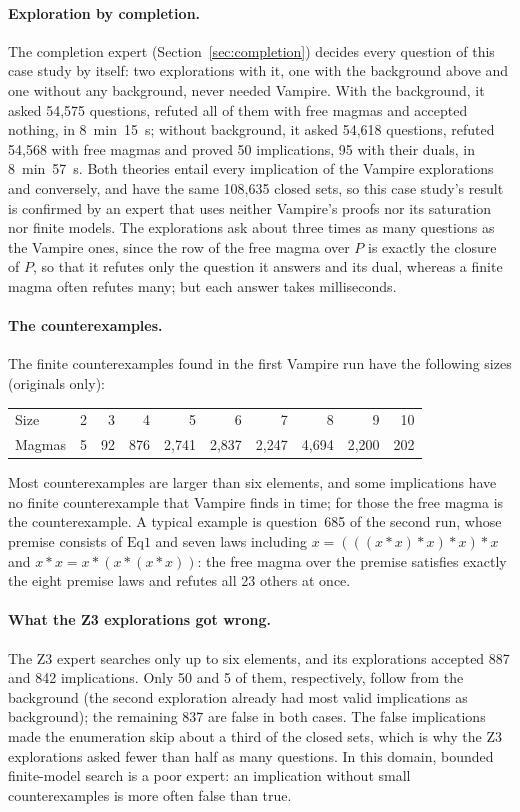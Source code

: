 \documentclass[11pt,a4paper]{article}
\theoremstyle{definition}
\theoremstyle{remark}
\newcommand{\Eq}[1]{\mathrm{Eq}#1}
\begin{document}
\paragraph{Exploration by completion.}
The completion expert (Section~\ref{sec:completion}) decides every question of this case study by itself: two explorations with it, one with the background above and one without any background, never needed Vampire. With the background, it asked 54,575 questions, refuted all of them with free magmas and accepted nothing, in 8~min~15~s; without background, it asked 54,618 questions, refuted 54,568 with free magmas and proved 50 implications, 95 with their duals, in 8~min~57~s. Both theories entail every implication of the Vampire explorations and conversely, and have the same 108,635 closed sets, so this case study's result is confirmed by an expert that uses neither Vampire's proofs nor its saturation nor finite models. The explorations ask about three times as many questions as the Vampire ones, since the row of the free magma over $P$ is exactly the closure of $P$, so that it refutes only the question it answers and its dual, whereas a finite magma often refutes many; but each answer takes milliseconds.

\paragraph{The counterexamples.}
The finite counterexamples found in the first Vampire run have the following sizes (originals only):
\begin{center}
\small
\begin{tabular}{@{}lrrrrrrrrr@{}}
\toprule
Size & 2 & 3 & 4 & 5 & 6 & 7 & 8 & 9 & 10 \\
Magmas & 5 & 92 & 876 & 2,741 & 2,837 & 2,247 & 4,694 & 2,200 & 202 \\
\bottomrule
\end{tabular}
\end{center}
Most counterexamples are larger than six elements, and some implications have no finite counterexample that Vampire finds in time; for those the free magma is the counterexample. A typical example is question~685 of the second run, whose premise consists of $\Eq{1}$ and seven laws including $x = (((x*x)*x)*x)*x$ and $x*x = x*(x*(x*x))$: the free magma over the premise satisfies exactly the eight premise laws and refutes all 23 others at once.

\paragraph{What the Z3 explorations got wrong.}
The Z3 expert searches only up to six elements, and its explorations accepted 887 and 842 implications. Only 50 and 5 of them, respectively, follow from the background (the second exploration already had most valid implications as background); the remaining 837 are false in both cases. The false implications made the enumeration skip about a third of the closed sets, which is why the Z3 explorations asked fewer than half as many questions. In this domain, bounded finite-model search is a poor expert: an implication without small counterexamples is more often false than true.
\end{document}
